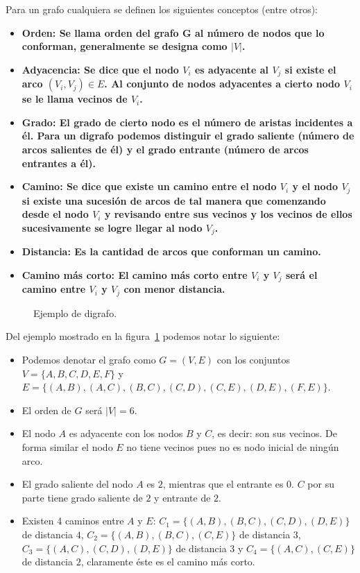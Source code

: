 Para un grafo cualquiera se definen los siguientes conceptos (entre otros):
\begin{itemize}
  \item \bf{Orden:}
    Se llama orden del grafo G al número de nodos que lo conforman, generalmente
    se designa como $|V|$.
  \item \bf{Adyacencia:}
    Se dice que el nodo $V_i$ es adyacente al $V_j$ si existe el arco 
    $(V_i, V_j) \in E$. Al conjunto de nodos adyacentes a cierto nodo $V_i$ se
    le llama \bf{vecinos} de $V_i$.
  \item \bf{Grado:}
    El grado de cierto nodo es el número de aristas incidentes a él. Para un
    digrafo podemos distinguir el grado saliente (número de arcos salientes de
    él) y el grado entrante (número de arcos entrantes a él).
  \item \bf{Camino:}
    Se dice que existe un camino entre el nodo $V_i$ y el nodo $V_j$ si existe
    una sucesión de arcos de tal manera que comenzando desde el nodo $V_i$ y
    revisando entre sus vecinos y los vecinos de ellos sucesivamente se logre
    llegar al nodo $V_j$.
  \item \bf{Distancia:}
    Es la cantidad de arcos que conforman un camino.
  \item \bf{Camino más corto:}
    El camino más corto entre $V_i$ y $V_j$ será el camino entre $V_i$ y $V_j$
    con menor distancia.
\end{itemize}

\begin{figure}[htpb]
  \centering
  
  \caption{Ejemplo de digrafo.}
  \label{fig:exgraph}
\end{figure}

Del ejemplo mostrado en la figura~\ref{fig:exgraph} podemos notar lo siguiente:
\begin{itemize}
  \item
    Podemos denotar el grafo como $G = (V,E)$ con los conjuntos 
    $V = \{A,B,C,D,E,F\}$ y 
    $E = \{(A,B),(A,C),(B,C),(C,D),(C,E),(D,E),(F,E)\}$.
  \item 
    El orden de $G$ será $|V| = 6$.
  \item
    El nodo $A$ es adyacente con los nodos $B$ y $C$, es decir: son sus vecinos.
    De forma similar el nodo $E$ no tiene vecinos pues no es nodo inicial de
    ningún arco.
  \item
    El grado saliente del nodo $A$ es $2$, mientras que el entrante es $0$.
    $C$ por su parte tiene grado saliente de $2$ y entrante de $2$.
  \item
    Existen 4 caminos entre $A$ y $E$: $C_1 = \{(A,B),(B,C),(C,D),(D,E)\}$ de
    distancia $4$, $C_2 = \{(A,B),(B,C),(C,E)\}$ de distancia $3$,
    $C_3 = \{(A,C),(C,D),(D,E)\}$ de distancia $3$ y
    $C_4 = \{(A,C),(C,E)\}$ de distancia $2$, claramente éste es el camino más
    corto.
\end{itemize}


